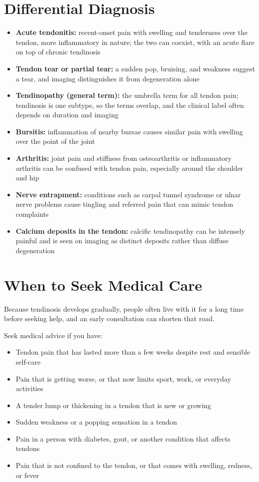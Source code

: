 \section*{Differential Diagnosis}
\begin{itemize}
    \item \textbf{Acute tendonitis:} recent-onset pain with swelling and tenderness over the tendon, more inflammatory in nature; the two can coexist, with an acute flare on top of chronic tendinosis
    \item \textbf{Tendon tear or partial tear:} a sudden pop, bruising, and weakness suggest a tear, and imaging distinguishes it from degeneration alone
    \item \textbf{Tendinopathy (general term):} the umbrella term for all tendon pain; tendinosis is one subtype, so the terms overlap, and the clinical label often depends on duration and imaging
    \item \textbf{Bursitis:} inflammation of nearby bursae causes similar pain with swelling over the point of the joint
    \item \textbf{Arthritis:} joint pain and stiffness from osteoarthritis or inflammatory arthritis can be confused with tendon pain, especially around the shoulder and hip
    \item \textbf{Nerve entrapment:} conditions such as carpal tunnel syndrome or ulnar nerve problems cause tingling and referred pain that can mimic tendon complaints
    \item \textbf{Calcium deposits in the tendon:} calcific tendinopathy can be intensely painful and is seen on imaging as distinct deposits rather than diffuse degeneration
\end{itemize}

\section*{When to Seek Medical Care}
Because tendinosis develops gradually, people often live with it for a long time before seeking help, and an early consultation can shorten that road.

Seek medical advice if you have:
\begin{itemize}
    \item Tendon pain that has lasted more than a few weeks despite rest and sensible self-care
    \item Pain that is getting worse, or that now limits sport, work, or everyday activities
    \item A tender lump or thickening in a tendon that is new or growing
    \item Sudden weakness or a popping sensation in a tendon
    \item Pain in a person with diabetes, gout, or another condition that affects tendons
    \item Pain that is not confined to the tendon, or that comes with swelling, redness, or fever
\end{itemize}

